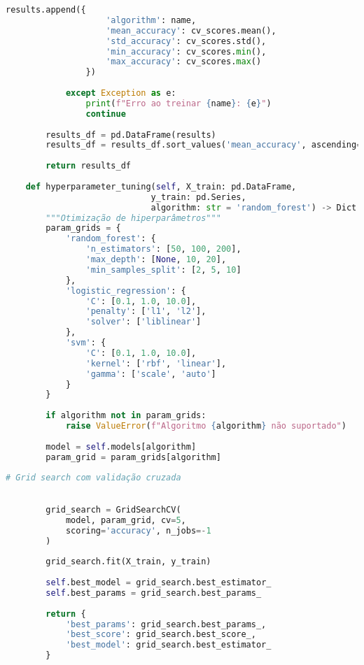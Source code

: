 \begin{pythonbox}
\begin{lstlisting}[language=Python]                
                results.append({
                    'algorithm': name,
                    'mean_accuracy': cv_scores.mean(),
                    'std_accuracy': cv_scores.std(),
                    'min_accuracy': cv_scores.min(),
                    'max_accuracy': cv_scores.max()
                })
                
            except Exception as e:
                print(f"Erro ao treinar {name}: {e}")
                continue
        
        results_df = pd.DataFrame(results)
        results_df = results_df.sort_values('mean_accuracy', ascending=False)
        
        return results_df
    
    def hyperparameter_tuning(self, X_train: pd.DataFrame, 
                             y_train: pd.Series,
                             algorithm: str = 'random_forest') -> Dict:
        """Otimização de hiperparâmetros"""
        param_grids = {
            'random_forest': {
                'n_estimators': [50, 100, 200],
                'max_depth': [None, 10, 20],
                'min_samples_split': [2, 5, 10]
            },
            'logistic_regression': {
                'C': [0.1, 1.0, 10.0],
                'penalty': ['l1', 'l2'],
                'solver': ['liblinear']
            },
            'svm': {
                'C': [0.1, 1.0, 10.0],
                'kernel': ['rbf', 'linear'],
                'gamma': ['scale', 'auto']
            }
        }
        
        if algorithm not in param_grids:
            raise ValueError(f"Algoritmo {algorithm} não suportado")
        
        model = self.models[algorithm]
        param_grid = param_grids[algorithm]

\end{lstlisting}
\end{pythonbox}
\begin{pythonbox}
\begin{lstlisting}[language=Python]          
        # Grid search com validação cruzada

        
        grid_search = GridSearchCV(
            model, param_grid, cv=5, 
            scoring='accuracy', n_jobs=-1
        )
        
        grid_search.fit(X_train, y_train)
        
        self.best_model = grid_search.best_estimator_
        self.best_params = grid_search.best_params_
        
        return {
            'best_params': grid_search.best_params_,
            'best_score': grid_search.best_score_,
            'best_model': grid_search.best_estimator_
        }
\end{lstlisting}
\end{pythonbox}

